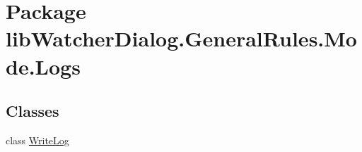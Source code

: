 \hypertarget{namespacelib_watcher_dialog_1_1_general_rules_1_1_mode_1_1_logs}{\section{Package lib\+Watcher\+Dialog.\+General\+Rules.\+Mode.\+Logs}
\label{namespacelib_watcher_dialog_1_1_general_rules_1_1_mode_1_1_logs}
}
\subsection*{Classes}
\begin{DoxyCompactItemize}
\item 
class \hyperlink{classlib_watcher_dialog_1_1_general_rules_1_1_mode_1_1_logs_1_1_write_log}{Write\+Log}
\end{DoxyCompactItemize}
